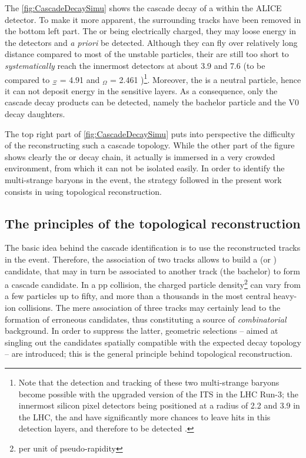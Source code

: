 The \fig\ref{fig:CascadeDecaySimu} shows the cascade decay of a \rmXiM within the ALICE detector. To make it more apparent, the surrounding tracks have been removed in the bottom left part. The \rmXiPM or \rmOmegaPM being electrically charged, they may loose energy in the detectors and \textit{a priori} be detected. Although they can fly over relatively long distance compared to most of the unstable particles, their \cTau are still too short to \textit{systematically} reach the innermost detectors at about 3.9 \cm and 7.6 \cm (to be compared to \cTau$_{\Xi}$ = 4.91 \cm and \cTau$_{\Omega}$ = 2.461 \cm)\footnote{Note that the detection and tracking of these two multi-strange baryons become possible with the upgraded version of the ITS in the LHC Run-3; the innermost silicon pixel detectors being positioned at a radius of 2.2 \cm and 3.9 \cm in the LHC, the \rmXi and \rmOmega have significantly more chances to leave hits in this detection layers, and therefore to be detected \cite{chinellatoCharmMulticharmBaryon2022}.}. Moreover, the \rmLambda is a neutral particle, hence it can not deposit energy in the sensitive layers. As a consequence, only the cascade decay products can be detected, namely the bachelor particle and the V0 decay daughters.

The top right part of \fig\ref{fig:CascadeDecaySimu} puts into perspective the difficulty of the reconstructing such a cascade topology. While the other part of the figure shows clearly the \rmXi or \rmOmega decay chain, it actually is immersed in a very crowded environment, from which it can not be isolated easily. In order to identify the multi-strange baryons in the event, the strategy followed in the present work consists in using topological reconstruction.

\subsection{The principles of the topological reconstruction}
\label{subsec:TopoReco}

The basic idea behind the cascade identification is to use the reconstructed tracks in the event. Therefore, the association of two tracks allows to build a \rmLambda (or \rmAlambda) candidate, that may in turn be associated to another track (the bachelor) to form a cascade candidate. In a pp collision, the charged particle density\footnote{per unit of pseudo-rapidity} can vary from a few particles up to fifty, and more than a thousands in the most central heavy-ion collisions. The mere association of three tracks may certainly lead to the formation of erroneous candidates, thus constituting a source of \textit{combinatorial} background. In order to suppress the latter, geometric selections -- aimed at singling out the candidates spatially compatible with the expected decay topology -- are introduced; this is the general principle behind topological reconstruction. 

